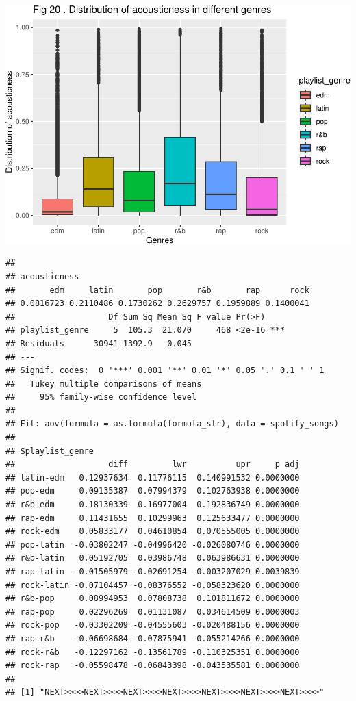 \documentclass[
]{article}
\begin{document}
\includegraphics{Final-Report_files/figure-latex/unnamed-chunk-14-16.pdf}

\begin{verbatim}
## 
## acousticness
##       edm     latin       pop       r&b       rap      rock 
## 0.0816723 0.2110486 0.1730262 0.2629757 0.1959889 0.1400041 
##                   Df Sum Sq Mean Sq F value Pr(>F)    
## playlist_genre     5  105.3  21.070     468 <2e-16 ***
## Residuals      30941 1392.9   0.045                   
## ---
## Signif. codes:  0 '***' 0.001 '**' 0.01 '*' 0.05 '.' 0.1 ' ' 1
##   Tukey multiple comparisons of means
##     95% family-wise confidence level
## 
## Fit: aov(formula = as.formula(formula_str), data = spotify_songs)
## 
## $playlist_genre
##                   diff         lwr          upr     p adj
## latin-edm   0.12937634  0.11776115  0.140991532 0.0000000
## pop-edm     0.09135387  0.07994379  0.102763938 0.0000000
## r&b-edm     0.18130339  0.16977004  0.192836749 0.0000000
## rap-edm     0.11431655  0.10299963  0.125633477 0.0000000
## rock-edm    0.05833177  0.04610854  0.070555005 0.0000000
## pop-latin  -0.03802247 -0.04996420 -0.026080746 0.0000000
## r&b-latin   0.05192705  0.03986748  0.063986631 0.0000000
## rap-latin  -0.01505979 -0.02691254 -0.003207029 0.0039839
## rock-latin -0.07104457 -0.08376552 -0.058323620 0.0000000
## r&b-pop     0.08994953  0.07808738  0.101811672 0.0000000
## rap-pop     0.02296269  0.01131087  0.034614509 0.0000003
## rock-pop   -0.03302209 -0.04555603 -0.020488156 0.0000000
## rap-r&b    -0.06698684 -0.07875941 -0.055214266 0.0000000
## rock-r&b   -0.12297162 -0.13561789 -0.110325351 0.0000000
## rock-rap   -0.05598478 -0.06843398 -0.043535581 0.0000000
## 
## [1] "NEXT>>>>NEXT>>>>NEXT>>>>NEXT>>>>NEXT>>>>NEXT>>>>NEXT>>>>"
\end{verbatim}
\end{document}
